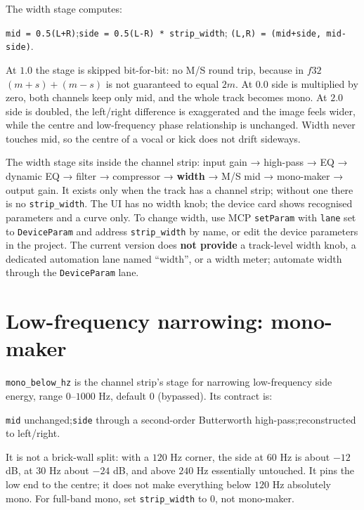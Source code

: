 The width stage computes:

\begin{center}
\texttt{mid = 0.5(L+R)};\quad \texttt{side = 0.5(L-R) * strip\_width};\quad
\texttt{(L,R) = (mid+side, mid-side)}.
\end{center}

At $1.0$ the stage is skipped bit-for-bit: no M/S round trip, because in $f32$ $(m+s)+(m-s)$ is not guaranteed to equal $2m$. At $0.0$ side is multiplied by zero, both channels keep only mid, and the whole track becomes mono. At $2.0$ side is doubled, the left/right difference is exaggerated and the image feels wider, while the centre and low-frequency phase relationship is unchanged. Width never touches mid, so the centre of a vocal or kick does not drift sideways.

The width stage sits inside the channel strip: input gain → high-pass → EQ → dynamic EQ → filter → compressor → \textbf{width} → M/S mid → mono-maker → output gain. It exists only when the track has a channel strip; without one there is no \texttt{strip\_width}. The UI has no width knob; the device card shows recognised parameters and a curve only. To change width, use MCP \texttt{setParam} with \texttt{lane} set to \texttt{DeviceParam} and address \texttt{strip\_width} by name, or edit the device parameters in the project. The current version does \textbf{not provide} a track-level width knob, a dedicated automation lane named ``width'', or a width meter; automate width through the \texttt{DeviceParam} lane.


\section{Low-frequency narrowing: mono-maker}

\texttt{mono\_below\_hz} is the channel strip's stage for narrowing low-frequency side energy, range $0$--$1000$ Hz, default $0$ (bypassed). Its contract is:

\begin{center}
\texttt{mid} unchanged;\quad \texttt{side} through a second-order Butterworth high-pass;\quad reconstructed to left/right.
\end{center}

It is not a brick-wall split: with a $120$ Hz corner, the side at $60$ Hz is about $-12$ dB, at $30$ Hz about $-24$ dB, and above $240$ Hz essentially untouched. It pins the low end to the centre; it does not make everything below $120$ Hz absolutely mono. For full-band mono, set \texttt{strip\_width} to $0$, not mono-maker.

